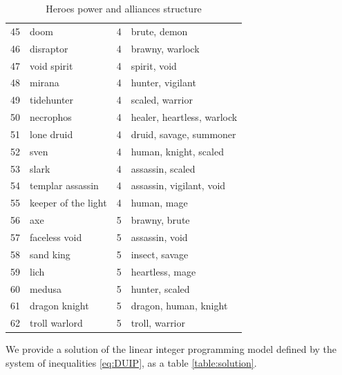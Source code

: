 \documentclass{article}
\begin{document}
\begin{table}
{\begin{tabular}{llrl}
45 &                 doom &      4 &                   brute, demon \\
46 &            disraptor &      4 &               brawny, warlock  \\
47 &          void spirit &      4 &                   spirit, void \\
48 &               mirana &      4 &               hunter, vigilant \\
49 &           tidehunter &      4 &               scaled, warrior  \\
50 &            necrophos &      4 &    healer, heartless, warlock  \\
51 &           lone druid &      4 &        druid, savage, summoner \\
52 &                 sven &      4 &          human, knight, scaled \\
53 &                slark &      4 &               assassin, scaled \\
54 &     templar assassin &      4 &       assassin, vigilant, void \\
55 &  keeper of the light &      4 &                    human, mage \\
56 &                  axe &      5 &                  brawny, brute \\
57 &        faceless void &      5 &                 assassin, void \\
58 &            sand king &      5 &                 insect, savage \\
59 &                 lich &      5 &                heartless, mage \\
60 &               medusa &      5 &                 hunter, scaled \\
61 &        dragon knight &      5 &          dragon, human, knight \\
62 &        troll warlord &      5 &                troll, warrior  \\
\bottomrule
\end{tabular}
}
\caption{Heroes power and alliances  structure}
\label{table:aliances}
\end{table}


We provide a solution of the linear integer programming model defined by the system of inequalities \eqref{eq:DUIP}, as a table \ref{table:solution}.
\end{document}

